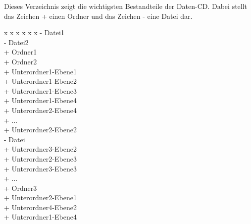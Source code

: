 Dieses Verzeichnis zeigt die wichtigsten Bestandteile der Daten-CD. Dabei stellt das Zeichen + einen Ordner und das Zeichen - eine Datei dar.

\vspace{1cm}
\parbox{0cm}{\begin{tabbing}
x \= x \= x \= x \= x \= x \kill
- Datei1 \\
- Datei2 \\
+ Ordner1 \\
+ Ordner2 \\
\> + Unterordner1-Ebene1 \\
\>\> + Unterordner1-Ebene2 \\
\>\>\> + Unterordner1-Ebene3 \\
\>\>\>\> + Unterordner1-Ebene4 \\
\>\>\>\> + Unterordner2-Ebene4 \\
\>\>\>\> + ... \\
\>\> + Unterordner2-Ebene2 \\
\>\>\> - Datei \\
\>\> + Unterordner3-Ebene2 \\
\>\>\> + Unterordner2-Ebene3 \\
\>\>\> + Unterordner3-Ebene3 \\
\>\>\> + ... \\
+ Ordner3 \\
\> + Unterordner2-Ebene1 \\
\>\> + Unterordner4-Ebene2 \\
\>\>\> + Unterordner1-Ebene4 \\
\end{tabbing}}